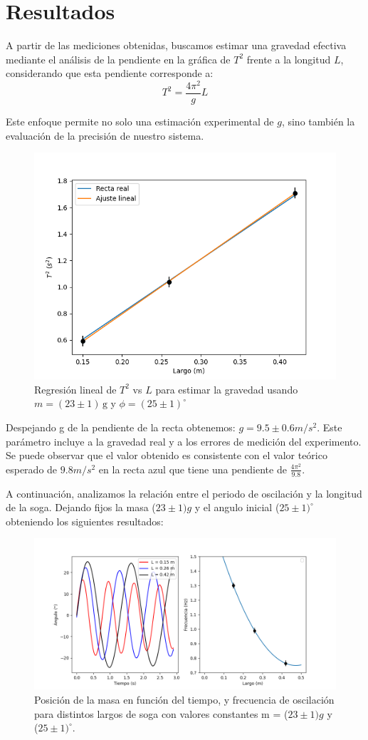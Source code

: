 \documentclass[12pt,a4]{article}
\begin{document}
\newpage

\section{Resultados}

A partir de las mediciones obtenidas, buscamos estimar una gravedad efectiva mediante el análisis de la pendiente en la gráfica de \( T^2 \) frente a la longitud \( L \), considerando que esta pendiente corresponde a:
\begin{equation}
    T^2 = \frac{4 \pi^2}{g} L
    \label{eq:gravedad}
\end{equation}

Este enfoque permite no solo una estimación experimental de \( g \), sino también la evaluación de la precisión de nuestro sistema. 

\begin{figure}[H]
    \centering
    \includegraphics[width=0.6\linewidth]{gravedad.png}
    \caption{Regresión lineal de \( T^2 \) vs \( L \) para estimar la gravedad usando $m = (23 \pm 1) \, \text{g}$ y $\phi = (25 \pm 1)^\circ$}
    \label{fig:gravedad}
\end{figure}

Despejando g de la pendiente de la recta obtenemos: $g = 9.5 \pm 0.6 m/s^2$. Este parámetro incluye a la gravedad real y a los errores de medición del experimento. Se puede observar que el valor obtenido es consistente con el valor teórico esperado de $9.8 m/s^2$ en la recta azul que tiene una pendiente de $\frac{4\pi^2}{9.8}$.

A continuación, analizamos la relación entre el periodo de oscilación y la longitud de la soga. Dejando fijos la masa ($23 \pm 1) g$ y el angulo inicial ($25 \pm 1) ^\circ$ obteniendo los siguientes resultados:

\begin{figure}[H]
    \centering
    \includegraphics[width=0.6\linewidth]{largo.png}
    \caption{Posición de la masa en función del tiempo, y frecuencia de oscilación para distintos largos de soga con valores constantes m = ($23 \pm 1) g$ y ($25 \pm 1) ^\circ$.}
    \label{fig:largo}
\end{figure}
\end{document}
